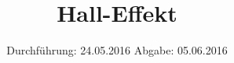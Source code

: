 
\subject{311}
\title{Hall-Effekt}
\date{
  Durchführung: 24.05.2016
  \hspace{3em}
  Abgabe: 05.06.2016
}



\maketitle
\newpage
\mbox{}
\newpage
\thispagestyle{empty}
\tableofcontents
\newpage






\nocite{numpy}
\nocite{matplotlib}
\nocite{uncertainties}
\printbibliography



